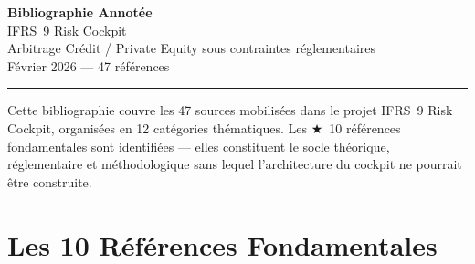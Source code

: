 \documentclass[12pt,a4paper]{article}
\begin{document}
\begin{center}
  {\LARGE\bfseries\color{darkblue} Bibliographie Annotée}\\[6pt]
  {\Large\color{steelblue} IFRS~9 Risk Cockpit}\\[4pt]
  {\large Arbitrage Crédit / Private Equity sous contraintes réglementaires}\\[12pt]
  {\normalsize Février 2026 --- 47 références}\\[6pt]
  \rule{0.6\textwidth}{0.4pt}
\end{center}

\vspace{8pt}

\begin{infobox}[Organisation]
Cette bibliographie couvre les 47 sources mobilisées dans le projet IFRS~9 Risk Cockpit, organisées en 12 catégories thématiques. Les \textcolor{goldstar}{$\bigstar$~10 références fondamentales} sont identifiées --- elles constituent le socle théorique, réglementaire et méthodologique sans lequel l'architecture du cockpit ne pourrait être construite.
\end{infobox}

\vspace{4pt}

\section{Les 10 Références Fondamentales}
\end{document}
